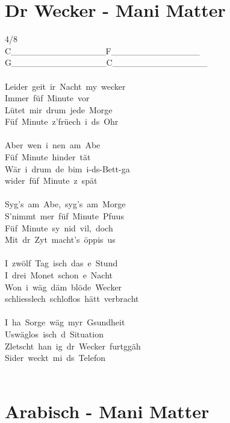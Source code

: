 \documentclass[]{book}
\let\stdsection\section
\renewcommand\section{\clearpage\stdsection}
\begin{document}
\hypertarget{dr-wecker---mani-matter}{%
\section{Dr Wecker - Mani Matter}\label{dr-wecker---mani-matter}}

4/8\\
\textbar C\_\_\_\_\_\_\_\textbar\_\_\_\_\_\_\_\_\textbar F\_\_\_\_\_\_\textbar\_\_\_\_\_\_\_\_\textbar{}\\
\textbar G\_\_\_\_\_\_\_\textbar\_\_\_\_\_\_\_\_\textbar C\_\_\_\_\_\_\_\textbar\_\_\_\_\_\_\_\_\textbar{}\\
~\\
Leider~geit~ir~Nacht~my~wecker\\
Immer~füf~Minute~vor\\
Lütet~mir~drum~jede~Morge\\
Füf~Minute~z'früech~i~ds~Ohr\\
~\\
Aber~wen~i~nen~am~Abe\\
Füf~Minute~hinder~tät\\
Wär~i~drum~de~bim~i-ds-Bett-ga\\
wider~füf~Minute~z~spät\\
~\\
Syg's~am~Abe,~syg's~am~Morge\\
S'nimmt~mer~füf~Minute~Pfuus\\
Füf~Minute~sy~nid~vil,~doch\\
Mit~dr~Zyt~macht's~öppis~us\\
~\\
I~zwölf~Tag~isch~das~e~Stund\\
I~drei~Monet~schon~e~Nacht\\
Won~i~wäg~däm~blöde~Wecker\\
schliesslech~schloflos~hätt~verbracht\\
~\\
I~ha~Sorge~wäg~myr~Gsundheit\\
Uswäglos~isch~d~Situation\\
Zletscht~han~ig~dr~Wecker~furtggäh\\
Sider~weckt~mi~ds~Telefon\\
~\\

\hypertarget{arabisch---mani-matter}{%
\section{Arabisch - Mani Matter}\label{arabisch---mani-matter}}
\end{document}
